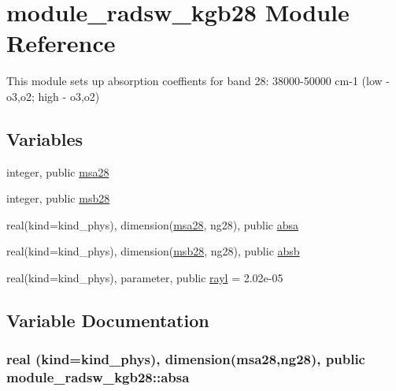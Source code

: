 \hypertarget{namespacemodule__radsw__kgb28}{}\section{module\+\_\+radsw\+\_\+kgb28 Module Reference}
\label{namespacemodule__radsw__kgb28}


This module sets up absorption coeffients for band 28\+: 38000-\/50000 cm-\/1 (low -\/ o3,o2; high -\/ o3,o2)  


\subsection*{Variables}
\begin{DoxyCompactItemize}
\item 
integer, public \hyperlink{namespacemodule__radsw__kgb28_a32c6693eb82a3ed47ed13e07f526471a}{msa28}
\item 
integer, public \hyperlink{namespacemodule__radsw__kgb28_a55d73e39264b431135c6a9c809e20a94}{msb28}
\item 
real(kind=kind\+\_\+phys), dimension(\hyperlink{namespacemodule__radsw__kgb28_a32c6693eb82a3ed47ed13e07f526471a}{msa28}, ng28), public \hyperlink{namespacemodule__radsw__kgb28_a5e48daf035b3b22b6e1b0f36aabcec10}{absa}
\item 
real(kind=kind\+\_\+phys), dimension(\hyperlink{namespacemodule__radsw__kgb28_a55d73e39264b431135c6a9c809e20a94}{msb28}, ng28), public \hyperlink{namespacemodule__radsw__kgb28_ac3834ddd9d9e2106dc739094c800d09b}{absb}
\item 
real(kind=kind\+\_\+phys), parameter, public \hyperlink{namespacemodule__radsw__kgb28_af3641febf88e97741b2cd86a56eda843}{rayl} = 2.\+02e-\/05
\end{DoxyCompactItemize}


\subsection{Variable Documentation}
\subsubsection[{\texorpdfstring{absa}{absa}}]{\setlength{\rightskip}{0pt plus 5cm}real (kind=kind\+\_\+phys), dimension({\bf msa28},ng28), public module\+\_\+radsw\+\_\+kgb28\+::absa}\hypertarget{namespacemodule__radsw__kgb28_a5e48daf035b3b22b6e1b0f36aabcec10}{}\label{namespacemodule__radsw__kgb28_a5e48daf035b3b22b6e1b0f36aabcec10}


